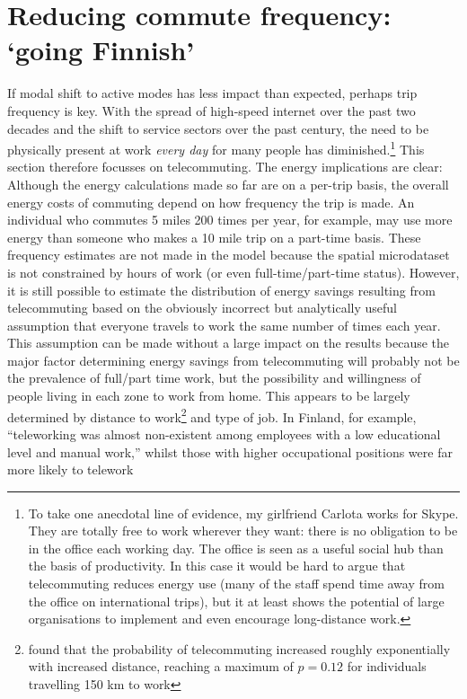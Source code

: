\documentclass[a4paper, 11pt, twoside]{Thesis}
\begin{document}
\section{Reducing commute frequency: `going Finnish'}
If modal shift to active modes has less impact than expected, perhaps
trip frequency is key. With the spread of high-speed internet over the
past two decades and the shift to service sectors over the past century,
the need to be physically present at work \emph{every day} for many people
has
diminished.\footnote{To
take one anecdotal line of evidence, my girlfriend Carlota works for Skype.
They are totally free to work wherever they want: there is no obligation to
be in the office each working day. The office is seen as a useful social hub
than the basis of productivity. In this case it would be hard to argue that
telecommuting reduces energy use (many of the staff spend time away from the
office on international trips), but it at least shows the potential of large
organisations to implement and even encourage long-distance work.
}
This section therefore focusses on telecommuting. The energy implications are clear:
Although the energy calculations made so far are on a per-trip basis, the
overall energy costs of commuting depend on how frequency the trip is made.
An individual who commutes 5 miles 200 times per year, for example, may
use more energy than someone who makes a 10 mile trip on a part-time basis.
These frequency estimates are not made in the model because the spatial
microdataset is not constrained by hours of work (or even full-time/part-time
status). However, it is still possible to estimate the distribution of
energy savings resulting from telecommuting based on the obviously incorrect
but analytically useful assumption that everyone travels to work the same
number of times each year. This assumption can be made without a large impact
on the results because the major factor determining energy savings from
telecommuting will probably not be the prevalence of full/part time work, but
the possibility and willingness of people living in each zone to work from home.
This appears to be largely determined by distance to
work\footnote{\citet{Helminen2007}
found that the probability of telecommuting increased roughly exponentially
with increased distance, reaching a maximum of $p=0.12$ for individuals travelling
150 km to work
}
and type of job. In Finland, for example, ``teleworking was almost non-existent
among employees with a low educational level and manual work,'' whilst those
with higher occupational positions were far more likely to telework
\end{document}
